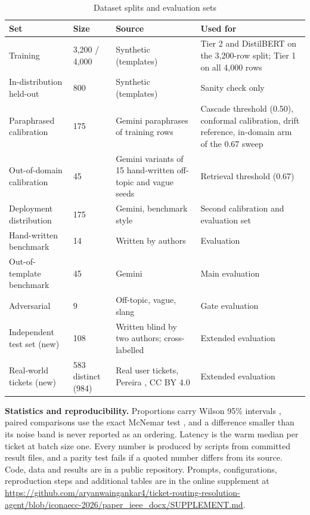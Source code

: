 \documentclass[conference,a4paper]{IEEEtran}
\begin{document}
\begin{table}[!t]
\caption{Dataset splits and evaluation sets}\label{tab:splits}
\centering
\scriptsize
\setlength{\tabcolsep}{3pt}
\begin{tabular}{|P{0.230}|P{0.160}|P{0.270}|P{0.340}|}
\hline
\textbf{Set} & \textbf{Size} & \textbf{Source} & \textbf{Used for}\\ \hline\hline
Training & 3,200 / 4,000 & Synthetic (templates) & Tier 2 and DistilBERT on the 3,200-row split; Tier 1 on all 4,000 rows\\ \hline
In-distribution held-out & 800 & Synthetic (templates) & Sanity check only\\ \hline
Paraphrased calibration & 175 & Gemini paraphrases of training rows & Cascade threshold (0.50), conformal calibration, drift reference, in-domain arm of the 0.67 sweep\\ \hline
Out-of-domain calibration & 45 & Gemini variants of 15 hand-written off-topic and vague seeds & Retrieval threshold (0.67)\\ \hline
Deployment distribution & 175 & Gemini, benchmark style & Second calibration and evaluation set\\ \hline
Hand-written benchmark & 14 & Written by authors & Evaluation\\ \hline
Out-of-template benchmark & 45 & Gemini & Main evaluation\\ \hline
Adversarial & 9 & Off-topic, vague, slang & Gate evaluation\\ \hline
Independent test set (new) & 108 & Written blind by two authors; cross-labelled & Extended evaluation\\ \hline
Real-world tickets (new) & 583 distinct (984) & Real user tickets, Pereira \cite{b20}, CC BY 4.0 & Extended evaluation\\ \hline
\end{tabular}
\end{table}

\textbf{Statistics and reproducibility.} Proportions carry Wilson 95\% intervals \cite{b21}, paired comparisons use the exact McNemar test \cite{b22}, and a difference smaller than its noise band is never reported as an ordering. Latency is the warm median per ticket at batch size one. Every number is produced by scripts from committed result files, and a parity test fails if a quoted number differs from its source. Code, data and results are in a public repository. Prompts, configurations, reproduction steps and additional tables are in the online supplement at \url{https://github.com/aryanwaingankar4/ticket-routing-resolution-agent/blob/iconaecc-2026/paper_ieee_docx/SUPPLEMENT.md}.
\end{document}
